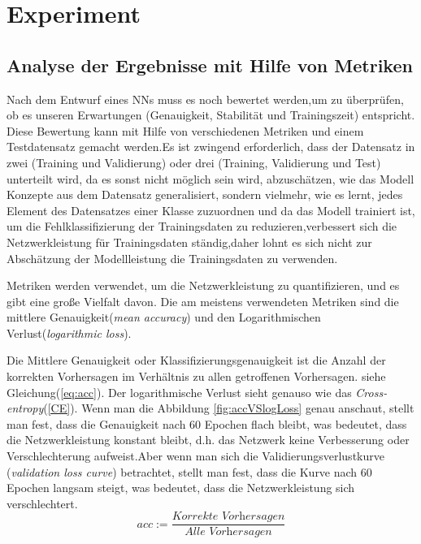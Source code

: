 \documentclass[12pt,a4paper]{scrartcl}
\numberwithin{equation}{section}
\begin{document}
\section{Experiment} \label{Experiment}

\subsection{Analyse der Ergebnisse mit Hilfe von Metriken}
Nach dem Entwurf eines \acsp{NN} muss es noch bewertet werden,um zu überprüfen, ob es unseren Erwartungen (Genauigkeit, Stabilität und Trainingszeit) entspricht. Diese Bewertung kann mit Hilfe von verschiedenen Metriken und einem Testdatensatz gemacht werden.Es ist zwingend erforderlich, dass der Datensatz in zwei (Training und Validierung) oder drei (Training, Validierung und Test) unterteilt wird, da es sonst nicht möglich sein wird, abzuschätzen, wie das Modell Konzepte aus dem Datensatz generalisiert, sondern vielmehr, wie es lernt, jedes Element des Datensatzes einer Klasse zuzuordnen und da das Modell trainiert ist, um die Fehlklassifizierung der Trainingsdaten zu reduzieren,verbessert sich die Netzwerkleistung für Trainingsdaten ständig,daher lohnt es sich nicht zur Abschätzung der Modellleistung die Trainingsdaten zu verwenden.

Metriken werden verwendet, um die Netzwerkleistung zu quantifizieren, und es gibt eine große Vielfalt davon. Die am meistens verwendeten Metriken sind  die mittlere Genauigkeit(\textit{mean accuracy}) und den Logarithmischen Verlust(\textit{logarithmic loss}).

Die Mittlere Genauigkeit oder Klassifizierungsgenauigkeit ist die Anzahl der korrekten Vorhersagen im Verhältnis zu allen getroffenen Vorhersagen. siehe Gleichung(\ref{eq:acc}).
Der logarithmische Verlust sieht genauso wie das \textit{Cross-entropy}(\ref{CE}). Wenn man die Abbildung \ref{fig:accVSlogLoss} genau anschaut, stellt man fest, dass die Genauigkeit nach 60 Epochen flach bleibt, was bedeutet, dass die Netzwerkleistung konstant bleibt, d.h. das Netzwerk keine Verbesserung oder Verschlechterung aufweist.Aber wenn man sich die Validierungsverlustkurve  (\textit{validation loss curve}) betrachtet, stellt man fest, dass die Kurve nach 60 Epochen langsam steigt, was bedeutet, dass die Netzwerkleistung sich verschlechtert.
\begin{equation}\label{eq:acc}
	acc := \dfrac{\textit{Korrekte Vorhersagen}}{\textit{Alle Vorhersagen}}
\end{equation}
\end{document}
